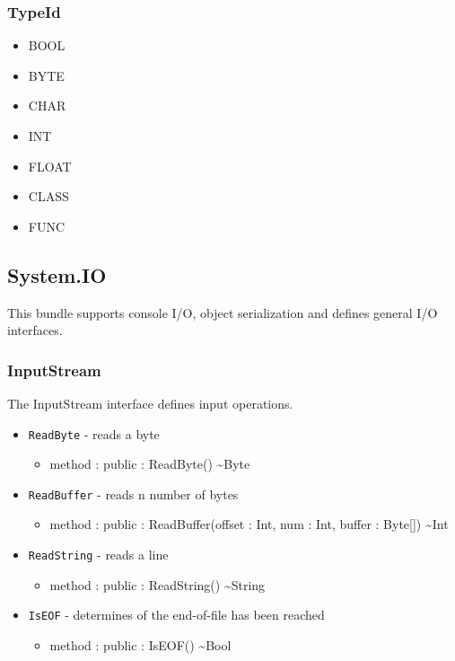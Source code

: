 \documentclass[11pt]{article}
\begin{document}
\subsubsection{TypeId}
\begin{itemize}
\item BOOL
\item BYTE
\item CHAR
\item INT
\item FLOAT
\item CLASS
\item FUNC
\end{itemize}

\subsection{System.IO}
This bundle supports console I/O, object serialization and defines
general I/O interfaces.

\subsubsection{InputStream}
The InputStream interface defines input operations.
\begin{itemize}
\item \texttt{ReadByte} - reads a byte
  \begin{itemize}
  \item method : public : ReadByte() \textasciitilde Byte
  \end{itemize}
\item \texttt{ReadBuffer} - reads n number of bytes
  \begin{itemize}
  \item method : public : ReadBuffer(offset : Int, num : Int, buffer :
    Byte[]) \textasciitilde Int
  \end{itemize}
\item \texttt{ReadString} - reads a line
  \begin{itemize}
  \item method : public : ReadString() \textasciitilde String
  \end{itemize}
\item \texttt{IsEOF} - determines of the end-of-file has been reached
  \begin{itemize}
  \item method : public : IsEOF() \textasciitilde Bool
  \end{itemize}
\end{itemize}
\end{document}
